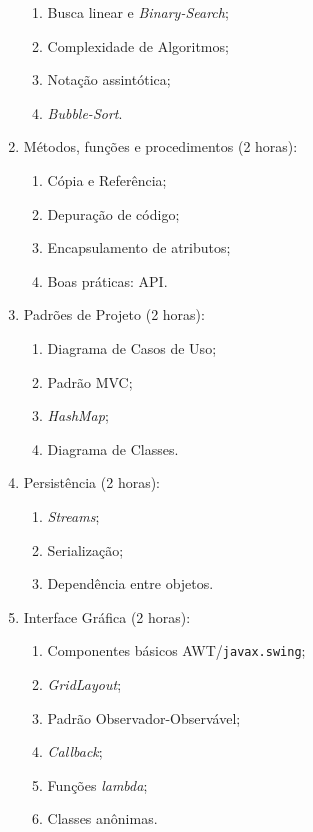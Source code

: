 \documentclass{article}
\begin{document}
\begin{enumerate}
\begin{enumerate}
            \item Busca linear e \textit{Binary-Search};
            \item Complexidade de Algoritmos;
            \item Notação assintótica;
            \item \textit{Bubble-Sort}.
        \end{enumerate}
    \item Métodos, funções e procedimentos (2 horas):
        \begin{enumerate}
            \item Cópia e Referência;
            \item Depuração de código;
            \item Encapsulamento de atributos;
            \item Boas práticas: API\@.
        \end{enumerate}
    \item Padrões de Projeto (2 horas):
        \begin{enumerate}
            \item Diagrama de Casos de Uso;
            \item Padrão MVC\@;
            \item \textit{HashMap};
            \item Diagrama de Classes.
        \end{enumerate}
    \item Persistência (2 horas):
        \begin{enumerate}
            \item \textit{Streams};
            \item Serialização;
            \item Dependência entre objetos.
        \end{enumerate}
    \item Interface Gráfica (2 horas):
        \begin{enumerate}
            \item Componentes básicos AWT/\texttt{javax.swing};
            \item \textit{GridLayout};
            \item Padrão Observador-Observável;
            \item \textit{Callback};
            \item Funções \textit{lambda};
            \item Classes anônimas.
        \end{enumerate}

\end{enumerate}
\end{document}
